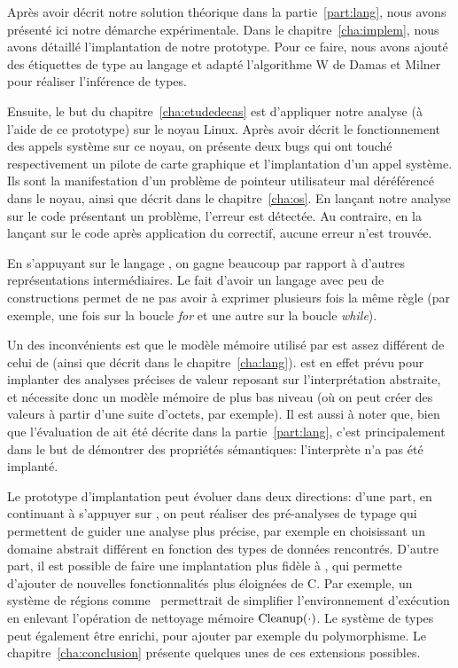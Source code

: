Après avoir décrit notre solution théorique dans la partie~\ref{part:lang}, nous
avons présenté ici notre démarche expérimentale. Dans le
chapitre~\ref{cha:implem}, nous avons détaillé l'implantation de notre
prototype. Pour ce faire, nous avons ajouté des étiquettes de type au langage
\newspeak et adapté l'algorithme W de Damas et Milner pour réaliser l'inférence
de types.

Ensuite, le but du chapitre~\ref{cha:etudedecas} est d'appliquer notre analyse
(à l'aide de ce prototype) sur le noyau Linux. Après avoir décrit le
fonctionnement des appels système sur ce noyau, on présente deux bugs qui ont
touché respectivement un pilote de carte graphique et l'implantation d'un appel
système. Ils sont la manifestation d'un problème de pointeur utilisateur mal
déréférencé dans le noyau, ainsi que décrit dans le chapitre~\ref{cha:os}. En
lançant notre analyse sur le code présentant un problème, l'erreur est détectée.
Au contraire, en la lançant sur le code après application du correctif, aucune
erreur n'est trouvée.

En s'appuyant sur le langage \newspeak, on gagne beaucoup par rapport à d'autres
représentations intermédiaires. Le fait d'avoir un langage avec peu de
constructions permet de ne pas avoir à exprimer plusieurs fois la même règle
(par exemple, une fois sur la boucle \emph{for} et une autre sur la boucle
\emph{while}).

\label{page:ccl-npk-spk}

Un des inconvénients est que le modèle mémoire utilisé par \newspeak est assez
différent de celui de \langname (ainsi que décrit dans le
chapitre~\ref{cha:lang}). \newspeak est en effet prévu pour implanter des
analyses précises de valeur reposant sur l'interprétation abstraite, et
nécessite donc un modèle mémoire de plus bas niveau (où on peut créer des
valeurs à partir d'une suite d'octets, par exemple). Il est aussi à noter que,
bien que l'évaluation de \langname ait été décrite dans la
partie~\ref{part:lang}, c'est principalement dans le but de démontrer des
propriétés sémantiques: l'interprète n'a pas été implanté.


Le prototype d'implantation peut évoluer dans deux directions: d'une part, en
continuant à s'appuyer sur \newspeak, on peut réaliser des pré-analyses de
typage qui permettent de guider une analyse plus précise, par exemple en
choisissant un domaine abstrait différent en fonction des types de données
rencontrés. D'autre part, il est possible de faire une implantation plus fidèle
à \langname, qui permette d'ajouter de nouvelles fonctionnalités plus éloignées
de C. Par exemple, un système de régions comme~\cite{jfp92} permettrait de
simplifier l'environnement d'exécution en enlevant l'opération de nettoyage
mémoire $\mathrm{Cleanup}(\cdot)$. Le système de types peut également être enrichi, pour
ajouter par exemple du polymorphisme. Le chapitre~\ref{cha:conclusion} présente
quelques unes de ces extensions possibles.

